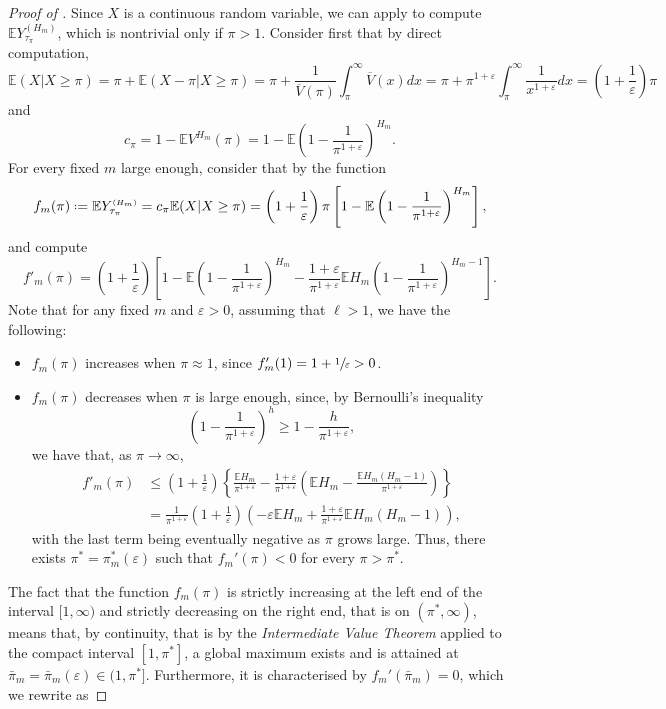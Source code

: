 \documentclass[11pt, a4paper, twoside]{article}
\newcommand*{\defeq}{\mathrel{\vcenter{\baselineskip0.5ex \lineskiplimit0pt
			\hbox{\scriptsize.}\hbox{\scriptsize.}}}=}
\newcommand{\ssup}[1]{{\scriptscriptstyle{({#1})}}}
\newcommand{\eps}{\varepsilon}
\newcommand{\EE}{\mathbb{E}}
\numberwithin{equation}{section}
\begin{document}
\begin{proof}[Proof of ]
		Since $X$ is a continuous random variable, we can apply  to compute $\EE Y_{\tau_\pi}^\ssup{H_m}$, which is nontrivial only if $\pi>1$. Consider first that by direct computation,
		\begin{equation}\label{conditional}
			\EE(X|X\ge\pi)=\pi+	\EE(X-\pi|X\ge\pi)=\pi+\frac{1}{\overline{V}(\pi)}\int_{\pi}^\infty\overline{V}(x)dx=\pi+\pi^{1+\eps}\int_{\pi}^\infty\frac{1}{x^{1+\eps}}dx=\left(1+\frac{1}{\eps}\right)\pi
		\end{equation}
		and
		\begin{equation}\label{c_pi}
			c_\pi=1-\EE V^{H_m}(\pi)=1-\EE\left(1-\frac{1}{\pi^{1+\eps}}\right)^{H_m}.
		\end{equation}
		For every fixed $m$ large enough, consider that by  the function \[f_m(\pi)\defeq \EE Y_{\tau_\pi}^{\ssup{H_m}}=c_\pi \EE(X|X\ge\pi)= \left(1+\frac{1}{\eps}\right)\pi\left[1-\EE\left(1-\frac{1}{\pi^{1+\eps}}\right)^{H_m}\right],\] and compute
		\[f'_m(\pi)=\left(1+\frac{1}{\eps}\right)\left[1-\EE\left(1-\frac{1}{\pi^{1+\eps}}\right)^{H_m}-\frac{1+\eps}{\pi^{1+\eps}}\EE H_m\left(1-\frac{1}{\pi^{1+\eps}}\right)^{H_m-1}\right].\]
		Note that for any fixed $m$ and $\eps>0$, assuming that $\ell>1$, we have the following: 
		\begin{itemize}[noitemsep]
    		\item $f_m(\pi)$ increases when $\pi\approx1$, since $f_m'(1)=1+\sfrac{1}{\eps}>0$.
    		\item $f_m(\pi)$ decreases when $\pi$ is large enough, since, by Bernoulli's inequality \[\left(1-\frac{1}{\pi^{1+\eps}}\right)^h\ge 1-\frac{h}{\pi^{1+\eps}},\] we have that, as $\pi\longrightarrow\infty$,
    		\begin{align*}
    			f'_m(\pi)&\le\left(1+\frac{1}{\eps}\right)\left\lbrace\frac{\EE H_m}{\pi^{1+\eps}}-\frac{1+\eps}{\pi^{1+\eps}}\left(\EE H_m-\frac{\EE H_m(H_m-1)}{\pi^{1+\eps}}\right)\right\rbrace\\&=\frac{1}{\pi^{1+\eps}}\left(1+\frac{1}{\eps}\right)\left(-\eps\EE H_m+\frac{1+\eps}{\pi^{1+\eps}}\EE H_m(H_m-1)\right),
    		\end{align*}
    		with the last term being eventually negative as $\pi$ grows large. 
            Thus, there exists $\pi^*=\pi_m^*(\eps)$ such that $f_m'(\pi)<0$ for every $\pi>\pi^*$.
		\end{itemize}
		The fact that the function $f_m(\pi)$ is strictly increasing at the left end of the interval $[1,\infty)$ and strictly decreasing on the right end, that is on $(\pi^*,\infty)$, means that, by continuity, that is by the \textit{Intermediate Value Theorem} applied to the compact interval $[1,\pi^*]$, a global maximum exists and is attained at $\bar{\pi}_m=\bar{\pi}_m(\eps)\in(1,\pi^*]$. Furthermore, it is characterised by $f_m'(\bar{\pi}_m)=0$, which we rewrite as

\end{proof}
\end{document}
